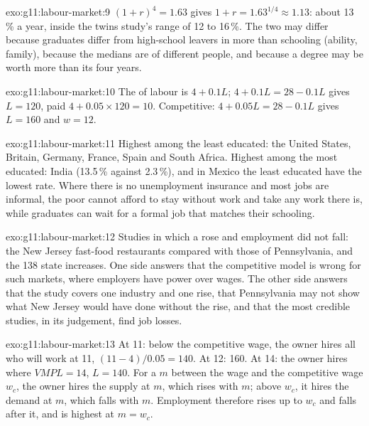 \begin{solution}{exo:g11:labour-market:9}
$(1 + r)^4 = 1.63$ gives $1 + r = 1.63^{1/4} \approx 1.13$: about 13\,\% a year, inside the twins study's range of 12 to 16\,\%. The two may differ because graduates differ from
high-school leavers in more than schooling (ability, family), because the medians are of different people, and because a degree may be worth more than its four years.
\end{solution}

\begin{solution}{exo:g11:labour-market:10}
The  of labour is $4 + 0.1L$; $4 + 0.1L = 28 - 0.1L$ gives $L = 120$, paid $4 + 0.05 \times 120 = 10$. Competitive: $4 + 0.05L = 28 - 0.1L$ gives $L = 160$ and
$w = 12$.
\end{solution}

\begin{solution}{exo:g11:labour-market:11}
Highest among the least educated: the United States, Britain, Germany, France, Spain and South Africa. Highest among the most educated: India (13.5\,\% against 2.3\,\%), and in
Mexico the least educated have the lowest rate. Where there is no unemployment insurance and most jobs are informal, the poor cannot afford to stay without work and take any
work there is, while graduates can wait for a formal job that matches their schooling.
\end{solution}

\begin{solution}{exo:g11:labour-market:12}
Studies in which a  rose and employment did not fall: the New Jersey fast-food restaurants compared with those of Pennsylvania, and the 138 state increases.
One side answers that the competitive model is wrong for such markets, where employers have power over wages. The other side answers that the study covers one industry and
one rise, that Pennsylvania may not show what New Jersey would have done without the rise, and that the most credible studies, in its judgement, find job losses.
\end{solution}

\begin{solution}{exo:g11:labour-market:13}
At 11: below the competitive wage, the owner hires all who will work at 11, $(11 - 4)/0.05 = 140$. At 12: 160. At 14: the owner hires where $\mathit{VMPL} = 14$, $L = 140$.
For a  $m$ between the  wage and the competitive wage $w_c$, the owner hires the supply at $m$, which rises with $m$; above $w_c$, it hires the demand at $m$, which falls
with $m$. Employment therefore rises up to $w_c$ and falls after it, and is highest at $m = w_c$.
\end{solution}

